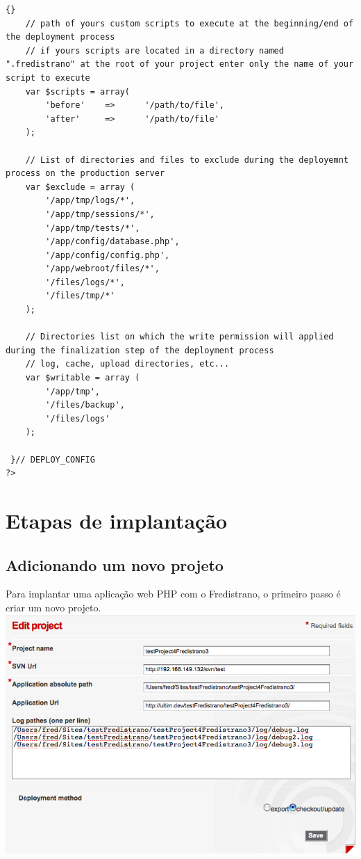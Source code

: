\documentclass[12pt,a4paper]{report}
\begin{document}
\begin{itemize}
\begin{lstlisting}[frame=tb]{}
 	// path of yours custom scripts to execute at the beginning/end of the deployment process
	// if yours scripts are located in a directory named ".fredistrano" at the root of your project enter only the name of your script to execute
 	var $scripts = array(
 		'before' 	=>		'/path/to/file', 
 		'after' 	=>		'/path/to/file' 
 	);
 	
	// List of directories and files to exclude during the deployemnt process on the production server
	var $exclude = array (
		'/app/tmp/logs/*',
		'/app/tmp/sessions/*',
		'/app/tmp/tests/*',
		'/app/config/database.php',
		'/app/config/config.php',
		'/app/webroot/files/*',
		'/files/logs/*',
		'/files/tmp/*'
	);
		
	// Directories list on which the write permission will applied during the finalization step of the deployment process	
	// log, cache, upload directories, etc...
	var $writable = array (
		'/app/tmp',
		'/files/backup',
		'/files/logs'
	);

 }// DEPLOY_CONFIG
?>
\end{lstlisting}

\end{itemize}
\newpage

\section{Etapas de implantação}

\subsection{Adicionando um novo projeto}

Para implantar uma aplicação web PHP com o Fredistrano, o primeiro passo é criar um novo projeto.\\

\includegraphics[width=1\textwidth]{doc_fredistrano1.png} 
\end{document}

